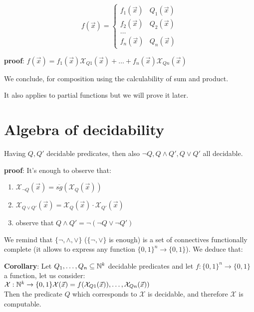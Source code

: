 \begin{equation*}
  f(\vec{x}) = \begin{cases}
    f_1(\vec{x}) & Q_1(\vec{x}) \\
    f_2(\vec{x}) & Q_2(\vec{x}) \\
    \dots        &              \\
    f_n(\vec{x}) & Q_n(\vec{x})
  \end{cases}
\end{equation*}

\textbf{proof}:
$f(\vec{x}) = f_1(\vec{x})\mathcal{X}_{Q1}(\vec{x}) + \dots + f_n(\vec{x})\mathcal{X}_{Qn}(\vec{x})$

We conclude, for composition using the calculability of sum and product.

It also applies to partial functions but we will prove it later.

\section{Algebra of decidability}
Having $ Q, Q' $   decidable predicates, then also $ \neg Q, Q \wedge Q', Q \vee Q' $ all decidable.

\textbf{proof}:
It's enough to observe that:
\begin{enumerate}
\item $ \mathcal{X}_{\lnot Q}(\vec{x}) =  \overline{sg}(\mathcal{X}_Q(\vec{x})) $
\item $\mathcal{X}_{Q \vee Q'}(\vec{x}) = \mathcal{X}_{Q}(\vec{x}) \cdot \mathcal{X}_{Q'}(\vec{x})$
\item observe that $Q \wedge Q' = \lnot (\lnot Q \vee \lnot Q')$
\end{enumerate}

We remind that $\{\neg, \wedge, \vee \}$ ($\{\neg, \vee \}$ is enough) is a set of connectives functionally complete (it allows to express any function $\{0,1\}^n \rightarrow \{0,1\}$). We deduce that:

\textbf{Corollary}: Let $Q_1, \dots, Q_n \subseteq \mathbb{N}^k$ decidable predicates and let $f:\{0,1\}^n \rightarrow \{0,1\}$ a function, let us consider:\\
$\mathcal{X}: \mathbb{N}^k\rightarrow\{0,1\}\\
\mathcal{X}(\vec{x}) = f(\mathcal{X}_{Q1}(\vec{x})), \dots, \mathcal{X}_{Qn}(\vec{x}) )$\\
Then the predicate $Q$ which corresponds to $\mathcal{X}$ is decidable, and therefore $\mathcal{X}$ is computable.

